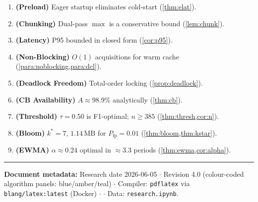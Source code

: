 \documentclass[11pt,a4paper]{article}
\theoremstyle{plain}
\theoremstyle{definition}
\theoremstyle{remark}
\begin{document}
\begin{enumerate}[label=\textbf{T\arabic*.}]
  \item \textbf{(Preload)} Eager startup eliminates cold-start (\cref{thm:elat}).
  \item \textbf{(Chunking)} Dual-pass $\max$ is a conservative bound (\cref{lem:chunk}).
  \item \textbf{(Latency)} P95 bounded in closed form (\cref{cor:p95}).
  \item \textbf{(Non-Blocking)} $O(1)$ acquisitions for warm cache (\cref{para:noblocking,para:dcl}).
  \item \textbf{(Deadlock Freedom)} Total-order locking (\cref{prop:deadlock}).
  \item \textbf{(CB Availability)} $A\approx98.9\%$ analytically (\cref{thm:cb}).
  \item \textbf{(Threshold)} $\tau=0.50$ is F1-optimal; $n\ge385$ (\cref{thm:thresh,cor:n}).
  \item \textbf{(Bloom)} $k^*=7$, $1.14\,\mathrm{MB}$ for $P_{\mathrm{fp}}=0.01$ (\cref{thm:bloom,thm:kstar}).
  \item \textbf{(EWMA)} $\alpha\approx0.24$ optimal in $\approx3.3$ periods (\cref{thm:ewma,cor:alpha}).
\end{enumerate}

\bigskip\hrule\vspace{4pt}
\noindent\small
\textbf{Document metadata:}
Research date 2026-06-05 $\cdot$
Revision 4.0 (colour-coded algorithm panels: blue/amber/teal) $\cdot$
Compiler: \texttt{pdflatex} via \texttt{blang/latex:latest} (Docker) $\cdot$
 $\cdot$ Data: \texttt{research.ipynb}.
\end{document}
